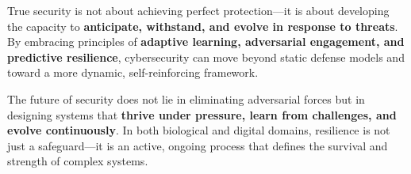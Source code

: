 \documentclass{article}
\begin{document}
True security is not about achieving perfect protection—it is about developing the capacity to \textbf{anticipate, withstand, and evolve in response to threats}. By embracing principles of \textbf{adaptive learning, adversarial engagement, and predictive resilience}, cybersecurity can move beyond static defense models and toward a more dynamic, self-reinforcing framework. 

The future of security does not lie in eliminating adversarial forces but in designing systems that \textbf{thrive under pressure, learn from challenges, and evolve continuously}. In both biological and digital domains, resilience is not just a safeguard—it is an active, ongoing process that defines the survival and strength of complex systems.



\end{document}
